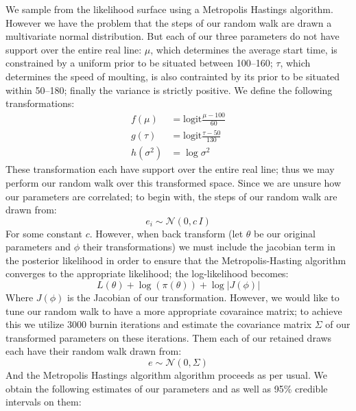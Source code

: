 \documentclass[
  12pt,
]{article}
\begin{document}
We sample from the likelihood surface using a Metropolis Hastings
algorithm. However we have the problem that the steps of our random walk
are drawn a multivariate normal distribution. But each of our three
parameters do not have support over the entire real line: \(\mu\), which
determines the average start time, is constrained by a uniform prior to
be situated between 100--160; \(\tau\), which determines the speed of
moulting, is also contrainted by its prior to be situated within
50--180; finally the variance is strictly positive. We define the
following transformations:\\
\[\begin{align}
f(\mu)&=\text{logit} \frac{\mu-100}{60}\\
g(\tau)&=\text{logit} \frac{\tau-50}{130}\\
h(\sigma^2)&= \log \sigma^2
\end{align}\] These transformation each have support over the entire
real line; thus we may perform our random walk over this transformed
space. Since we are unsure how our parameters are correlated; to begin
with, the steps of our random walk are drawn from:\\
\[e_i\sim\mathcal{N}(0,c \,I)\] For some constant \(c\). However, when
back transform (let \(\theta\) be our original parameters and \(\phi\)
their transformations) we must include the jacobian term in the
posterior likelihood in order to ensure that the Metropolis-Hasting
algorithm converges to the appropriate likelihood; the log-likelihood
becomes: \[L(\theta)+\log(\pi(\theta))+\log|J(\phi)|\] Where \(J(\phi)\)
is the Jacobian of our transformation. However, we would like to tune
our random walk to have a more appropriate covaraince matrix; to achieve
this we utilize 3000 burnin iterations and estimate the covariance
matrix \(\Sigma\) of our transformed parameters on these iterations.
Them each of our retained draws each have their random walk drawn from:
\[e\sim\mathcal{N}(0,\Sigma)\] And the Metropolis Hastings algorithm
algorithm proceeds as per usual. We obtain the following estimates of
our parameters and as well as 95\% credible intervals on them:
\end{document}
